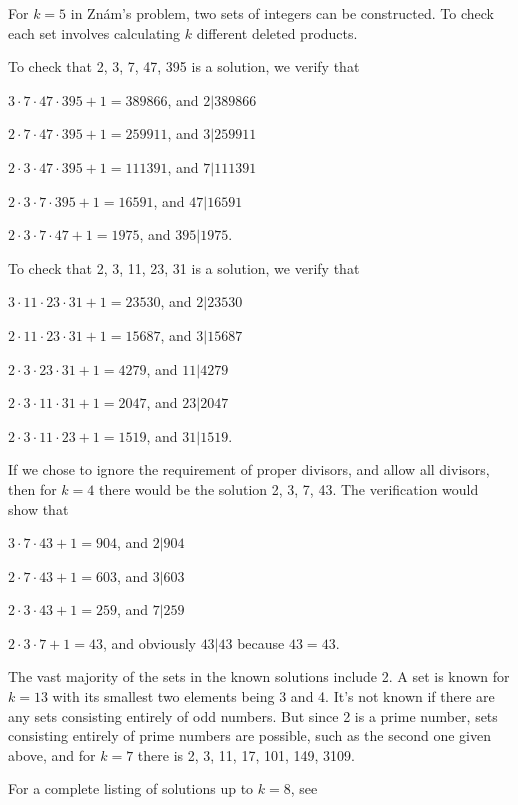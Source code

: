 \documentclass{article}
\begin{document}
For $k = 5$ in Zn\'am's problem, two sets of integers can be constructed. To check each set involves calculating $k$ different deleted products.

To check that 2, 3, 7, 47, 395 is a solution, we verify that

$3 \cdot 7 \cdot 47 \cdot 395 + 1 = 389866$, and $2|389866$

$2 \cdot 7 \cdot 47 \cdot 395 + 1 = 259911$, and $3|259911$

$2 \cdot 3 \cdot 47 \cdot 395 + 1 = 111391$, and $7|111391$

$2 \cdot 3 \cdot 7 \cdot 395 + 1 = 16591$, and $47|16591$

$2 \cdot 3 \cdot 7 \cdot 47 + 1 = 1975$, and $395|1975$.

To check that 2, 3, 11, 23, 31 is a solution, we verify that

$3 \cdot 11 \cdot 23 \cdot 31 + 1 = 23530$, and $2|23530$

$2 \cdot 11 \cdot 23 \cdot 31 + 1 = 15687$, and $3|15687$

$2 \cdot 3 \cdot 23 \cdot 31 + 1 = 4279$, and $11|4279$

$2 \cdot 3 \cdot 11 \cdot 31 + 1 = 2047$, and $23|2047$

$2 \cdot 3 \cdot 11 \cdot 23 + 1 = 1519$, and $31|1519$.

If we chose to ignore the requirement of proper divisors, and allow all divisors, then for $k = 4$ there would be the solution 2, 3, 7, 43. The verification would show that

$3 \cdot 7  \cdot  43 + 1 = 904$, and $2|904$

$2 \cdot 7  \cdot  43 + 1 = 603$, and $3|603$

$2 \cdot 3  \cdot  43 + 1 = 259$, and $7|259$

$2 \cdot 3  \cdot  7 + 1 = 43$, and obviously $43|43$ because $43 = 43$.

The vast majority of the sets in the known solutions include 2. A set is known for $k = 13$ with its smallest two elements being 3 and 4. It's not known if there are any sets consisting entirely of odd numbers. But since 2 is a prime number, sets consisting entirely of prime numbers are possible, such as the second one given above, and for $k = 7$ there is 2, 3, 11, 17, 101, 149, 3109.

For a complete listing of solutions up to $k = 8$, see 
\end{document}
